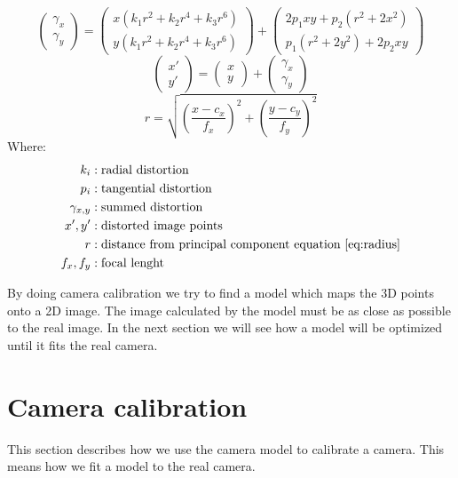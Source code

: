 \documentclass[11pt,a4paper,titlepage,oneside]{report}
\begin{document}
\begin{equation}\label{eq:dist}
	\begin{pmatrix}\gamma_{x} \\
	  \gamma_{y}
	\end{pmatrix}=\begin{pmatrix}
	  x(k_1r^2+k_2r^4+k_3r^6)\\
	  y(k_1r^2+k_2r^4+k_3r^6)
	\end{pmatrix}+\begin{pmatrix}
	  2p_1xy+p_2(r^2+2x^2)\\
	  p_1(r^2+2y^2)+2p_2xy
	\end{pmatrix}
\end{equation}
\begin{equation}\label{eq:pdist}
\begin{pmatrix}x'\\y'\end{pmatrix}=\begin{pmatrix}
x\\y\end{pmatrix}+\begin{pmatrix}\gamma_{x}\\\gamma_{y}\end{pmatrix}
\end{equation}
\begin{equation}\label{eq:radius}
	r = \sqrt{\left(\frac{x-c_x}{f_x}\right)^2+\left(\frac{y-c_y}{f_y}\right)^2}
\end{equation}
Where:
\begin{align*}
  k_{i}					&: \text{radial distortion}\\
  p_{i}					&: \text{tangential distortion}\\
	\gamma_{x,y}	&: \text{summed distortion}\\
  x',y'					&: \text{distorted image points}\\
	r							&: \text{distance from principal component equation \ref{eq:radius}} \\
	f_x,f_y				&: \text{focal lenght}
\end{align*}

By doing camera calibration we try to find a model which maps the 3D points onto a 2D image. The image calculated by the model must be as close as possible to the real image. In the next section we will see how a model will be optimized until it fits the real camera.

\section{Camera calibration}\label{sec:cam_calib}
This section describes how we use the camera model to calibrate a camera. This means how we fit a model to the real camera.
\end{document}
